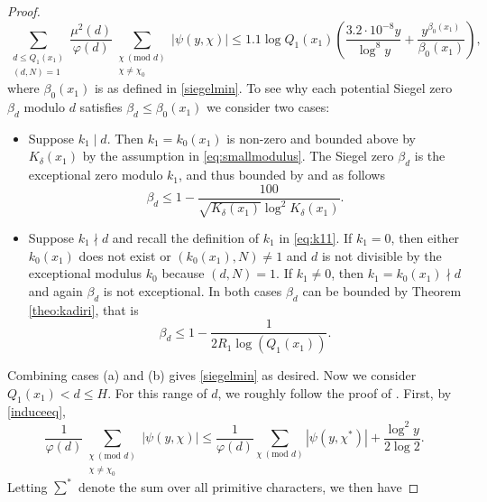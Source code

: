 \documentclass[12pt]{amsart}
\begin{document}
\begin{proof}
\begin{equation}
        \sum_{\substack{d\le Q_1(x_1)\\(d,N)=1}} \frac{\mu^2(d)}{\varphi(d)} \sum_{\substack{\chi \: (\text{mod }d) \\ \chi \ne \chi_0}} |\psi(y, \chi)| \le 1.1\log Q_1(x_1) \left( \frac{3.2\cdot 10^{-8}y}{\log^{8}y}+\frac{y^{\beta_0(x_1)}}{\beta_0(x_1)} \right),
    \end{equation}
    where $\beta_0(x_1)$ is as defined in \eqref{siegelmin}. To see why each potential Siegel zero $\beta_d$ modulo $d$ satisfies $\beta_d\le \beta_0(x_1)$ we consider two cases:
    \begin{itemize}
        \item[(a)] Suppose $k_1 \mid d$. Then $k_1 = k_0(x_1)$ is non-zero and bounded above by $K_{\delta}(x_1)$ by the assumption in \eqref{eq:smallmodulus}. The Siegel zero $\beta_d$ is the exceptional zero modulo $k_1$, and thus bounded by \cite[Theorem 1.3]{Bordignon1} and \cite[Theorem 1.3]{Bordignon2} as follows
        \begin{equation*}
            \beta_d\le 1-\frac{100}{\sqrt{K_{\delta}(x_1)}\log^2K_{\delta}(x_1)}.
        \end{equation*}
        \item [(b)] Suppose $k_1\nmid d$ and recall the definition of $k_1$ in \eqref{eq:k11}. If $k_1 = 0$, then either $k_0(x_1)$ does not exist or $(k_0(x_1), N) \ne 1$ and $d$ is not divisible by the exceptional modulus $k_0$ because $(d,N)=1$. If $k_1 \ne 0$, then $k_1 = k_0(x_1) \nmid d$ and again $\beta_d$ is not exceptional. In both cases $\beta_d$ can be bounded by Theorem \ref{theo:kadiri}, that is
        \begin{equation*}
            \beta_d\le 1-\frac{1}{2R_1\log(Q_1(x_1))}.
        \end{equation*}
    \end{itemize}
    Combining cases (a) and (b) gives \eqref{siegelmin} as desired. Now we consider $Q_1(x_1)<d\le H$. For this range of $d$, we roughly follow the proof of \cite[Theorem 1.3]{Akbary}. First, by \eqref{induceeq},
    \begin{equation} \label{eq: case Q_1 < d < H, part 1}
        \frac{1}{\varphi(d)} \sum_{\substack{\chi \: (\text{mod }d) \\ \chi \ne \chi_0}} |\psi(y, \chi)|
        \le\frac{1}{\varphi(d)}\sum_{\chi\:(\text{mod }d)}\left|\psi(y,\chi^*)\right|+\frac{\log^2y}{2\log 2}.
    \end{equation}
    Letting $\sum^*$ denote the sum over all primitive characters, we then have

\end{proof}
\end{document}
